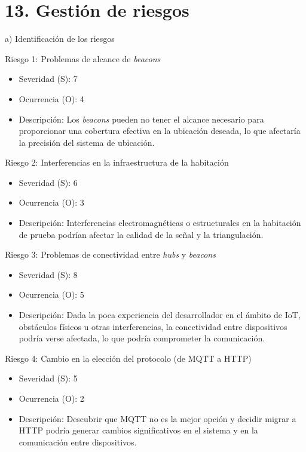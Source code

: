 \documentclass[
11pt, %
]{charter}
\begin{document}
\section{13. Gestión de riesgos}
\label{sec:riesgos}

a) Identificación de los riesgos
 
Riesgo 1: Problemas de alcance de \textit{beacons}
\begin{itemize}
	\item Severidad (S): 7
	\item Ocurrencia (O): 4
	\item Descripción: Los \textit{beacons} pueden no tener el alcance necesario para proporcionar una cobertura efectiva en la ubicación deseada, lo que afectaría la precisión del sistema de ubicación.
\end{itemize}   

Riesgo 2: Interferencias en la infraestructura de la habitación
\begin{itemize}
	\item Severidad (S): 6
	\item Ocurrencia (O): 3
	\item Descripción: Interferencias electromagnéticas o estructurales en la habitación de prueba podrían afectar la calidad de la señal y la triangulación.
\end{itemize}

Riesgo 3: Problemas de conectividad entre \textit{hubs} y \textit{beacons}
\begin{itemize}
	\item Severidad (S): 8
	\item Ocurrencia (O): 5
	\item Descripción: Dada la poca experiencia del desarrollador en el ámbito de IoT, obstáculos físicos u otras interferencias, la conectividad entre dispositivos podría verse afectada, lo que podría comprometer la comunicación.
\end{itemize}

Riesgo 4: Cambio en la elección del protocolo (de MQTT a HTTP)
\begin{itemize}
	\item Severidad (S): 5
	\item Ocurrencia (O): 2
	\item Descripción: Descubrir que MQTT no es la mejor opción y decidir migrar a HTTP podría generar cambios significativos en el sistema y en la comunicación entre dispositivos.
\end{itemize}
\end{document}
